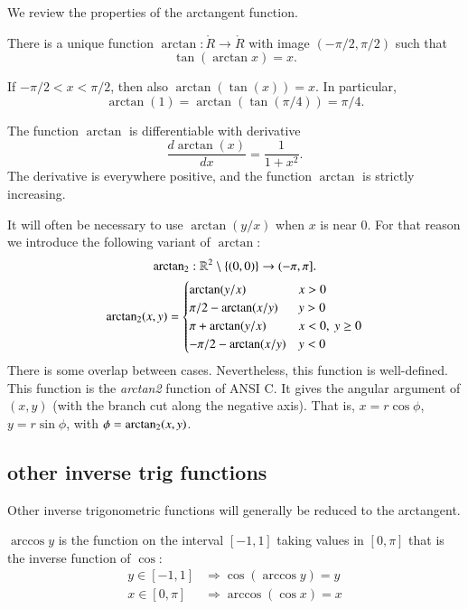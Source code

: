 We review the properties of the arctangent function.

\begin{definition}\label{definition:arctan}
There is a unique function $\arctan:\ring{R}\to\ring{R}$ with
image $(-\pi/2,\pi/2)$ such that
    $$\tan(\arctan x) =x.$$
\end{definition}

If $-\pi/2 < x < \pi/2$, then also $\arctan(\tan(x)) = x$. In
particular,
    $$\arctan(1) = \arctan(\tan(\pi/4)) = \pi/4.$$


The function $\arctan$ is differentiable with derivative
    $$\frac{d \arctan(x)}{dx} = \frac{1}{1 + x^2}.$$
The derivative is everywhere positive, and the function $\arctan$ is
strictly increasing.


It will often be necessary to use $\arctan(y/x)$ when $x$ is near $0$.
For that reason we introduce the following variant of $\arctan$:
$$
{\operatorname{arctan_2}}: \mathbb{R}^2\setminus\{(0,0)\} \to (-\pi,\pi].
$$
$$
\atn(x,y) = \begin{cases}
   \arctan(y/x) & x > 0\\
   \pi/2- \arctan(x/y) & y > 0 \\
   \pi + \arctan(y/x) & x< 0,\  y\ge 0\\
   -\pi/2- \arctan(x/y) & y< 0 \\
\end{cases}
\index{arctan}
$$
There is some overlap between cases. Nevertheless, 
this function is well-defined.  
This function is the {\it arctan2} function of ANSI C.  It gives the
angular argument of $(x,y)$ (with the branch cut along the negative axis).
That is, $x = r\cos\phi$, $y=r\sin\phi$, with $\phi={\operatorname{arctan_2}}(x,y)$.


\subsection{other inverse trig functions}

Other inverse trigonometric functions will generally be reduced to
the arctangent.

\begin{definition}\label{definition:arccos}
$\arccos y$ is the function on the interval $[-1,1]$
taking values in $[0,\pi]$ that is the inverse function of $\cos$:
    $$\begin{array}{lll}
        y\in [-1,1] &\Rightarrow \cos(\arccos y) = y\\
        x\in[0,\pi] &\Rightarrow \arccos(\cos x) = x
    \end{array}$$
\end{definition}

